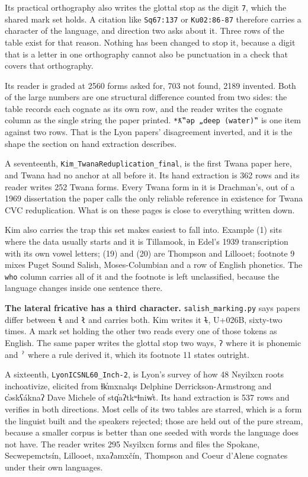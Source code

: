 Its practical orthography also writes the glottal stop as the digit \texttt{7}, which the shared mark set holds. A citation like \texttt{Sq67:137} or \texttt{Ku02:86-\allowbreak{}87} therefore carries a character of the language, and direction two asks about it. Three rows of the table exist for that reason. Nothing has been changed to stop it, because a digit that is a letter in one orthography cannot also be punctuation in a check that covers that orthography.

Its reader is graded at 2560 forms asked for, 703 not found, 2189 invented. Both of the large numbers are one structural difference counted from two sides: the table records each cognate as its own row, and the reader writes the cognate column as the single string the paper printed. \texttt{*ƛ‟ǝp „deep (water)‟} is one item against two rows. That is the Lyon papers' disagreement inverted, and it is the shape the section on hand extraction describes.

A seventeenth, \texttt{Kim\_\allowbreak{}Twana\allowbreak{}Reduplication\_\allowbreak{}final}, is the first Twana paper here, and Twana had no anchor at all before it. Its hand extraction is 362 rows and its reader writes 252 Twana forms. Every Twana form in it is Drachman's, out of a 1969 dissertation the paper calls the only reliable reference in existence for Twana CVC reduplication. What is on these pages is close to everything written down.

Kim also carries the trap this set makes easiest to fall into. Example (1) sits where the data usually starts and it is Tillamook, in Edel's 1939 transcription with its own vowel letters; (19) and (20) are Thompson and Lillooet; footnote 9 mixes Puget Sound Salish, Moses-Columbian and a row of English phonetics. The \texttt{who} column carries all of it and the footnote is left unclassified, because the language changes inside one sentence there.

\textbf{The lateral fricative has a third character.} \texttt{salish\_\allowbreak{}marking.\allowbreak{}py} says papers differ between \texttt{ɬ} and \texttt{ł} and carries both. Kim writes it \texttt{ɫ}, U+026B, sixty-two times. A mark set holding the other two reads every one of those tokens as English. The same paper writes the glottal stop two ways, \texttt{ʔ} where it is phonemic and \texttt{ˀ} where a rule derived it, which its footnote 11 states outright.

A sixteenth, \texttt{Lyon\allowbreak{}ICSNL60\_\allowbreak{}Inch-\allowbreak{}2}, is Lyon's survey of how 48 Nsyilxcn roots inchoativize, elicited from ɬk̓mxnalqs Delphine Derrickson-Armstrong and c̓əskʕáknaʔ Dave Michele of stq̓aʔtkʷɬniw̓t. Its hand extraction is 537 rows and verifies in both directions. Most cells of its two tables are starred, which is a form the linguist built and the speakers rejected; those are held out of the pure stream, because a smaller corpus is better than one seeded with words the language does not have. The reader writes 295 Nsyilxcn forms and files the Spokane, Secwepemctsín, Lillooet, nxaʔamxčín, Thompson and Coeur d'Alene cognates under their own languages.

